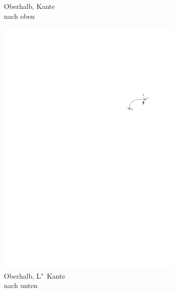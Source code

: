 \documentclass[a4paper]{scrreprt}
\theoremstyle{definition}
\begin{document}
\begin{figure}[h]
\begin{subfigure}[b]{0.2\textwidth}
                \caption{Oberhalb, Kante \\ nach oben}
                \label{fig:cutfinding_top_upwards}
        \end{subfigure}
        \quad
        \begin{subfigure}[b]{0.2\textwidth}
                \includegraphics[width=\textwidth]{schnitt_finden/top_downwardsL}
                \caption{Oberhalb, L"~Kante \\ nach unten}
                \label{fig:cutfinding_top_downwardsL}
        \end{subfigure}
        \quad
        \begin{subfigure}[b]{0.2\textwidth}

\end{subfigure}
\end{figure}
\end{document}
